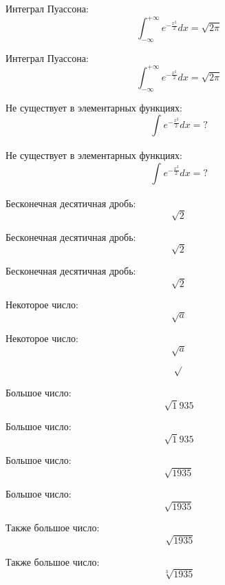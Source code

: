\documentclass[a4paper, 12pt]{article}
\begin{document}
    Интеграл Пуассона:
    \[\int_{-\infty}^{+\infty} e^{-\frac{x^2}{2}}dx = \sqrt{2\pi}\]

    Интеграл Пуассона:
    \[\int_{-\infty}^{+\infty} e^{-\frac{x^2}{2}}dx = \sqrt{2 \pi}\]

    Не существует в элементарных функциях:
    \[\int_{}^{} e^{-\frac{x^2}{2}}dx = ?\] %

    Не существует в элементарных функциях:
    \[\int_{}^{} e^{-\frac{x^2}{2}}dx ={ }?\] %

    Бесконечная десятичная дробь:
    \[\sqrt{2}\]

    Бесконечная десятичная дробь:
    \[\sqrt2\] %

    Бесконечная десятичная дробь:
    \[\sqrt 2\] %

    Некоторое число:
    \[\sqrt{a}\]

    Некоторое число:
    \[\sqrt a\] %

    \[\sqrt{}\] %

    Большое число:
    \[\sqrt 1935\] %

    Большое число:
    \[\sqrt1935\] %

    Большое число:
    \[\sqrt{1935}\] %

    Большое число:
    \[\sqrt {1935}\] %

    Также большое число:
    \[\sqrt[]{1935}\] %

    Также большое число:
    \[\sqrt[3]{1935}\]
\end{document}
